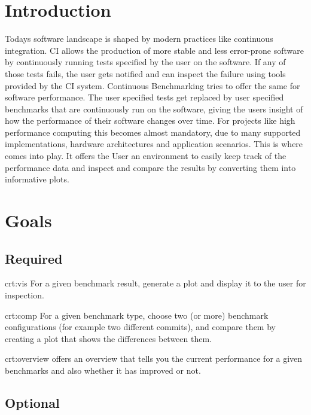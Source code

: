 \section{Introduction}

Todays software landscape is shaped by modern practices like continuous integration. CI allows the production of more stable and less error-prone software by continuously running tests specified by the user on the software. If any of those tests fails, the user gets notified and can inspect the failure using tools provided by the CI system. Continuous Benchmarking tries to offer the same for software performance. The user specified tests get replaced by user specified benchmarks that are continuously run on the software, giving the users insight of how the performance of their software changes over time. For projects like high performance computing this becomes almost mandatory, due to many supported implementations, hardware architectures and application scenarios. This is where \parkview{} comes into play. It offers the User an environment to easily keep track of the performance data and inspect and compare the results by converting them into informative plots.

\section{Goals}

\subsection{Required}

{crt:vis}
{For a given \gls{benchmark result}, generate a \gls{plot} and display it to the user for inspection.}

{crt:comp}
{For a given \gls{benchmark type}, choose two (or more) \glspl{benchmark configuration} (for example two different commits), and compare them by creating a \gls{plot} that shows the differences between them.}

{crt:overview}
{\parkview offers an overview that tells you the current performance for a given benchmarks and also whether it has improved or not.}

\subsection{Optional}

